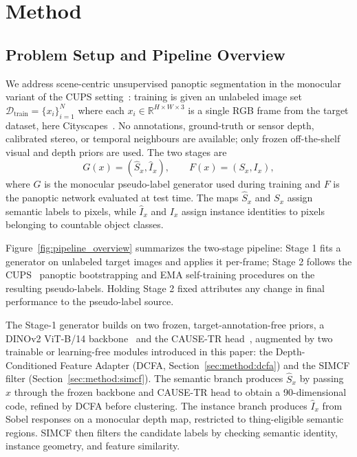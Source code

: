 \documentclass{article}
\begin{document}
\section{Method}
\label{sec:method}

\subsection{Problem Setup and Pipeline Overview}
\label{sec:method:setup}

We address scene-centric unsupervised panoptic segmentation in the monocular variant of the CUPS setting~\cite{hahn2025cups}: training is given an unlabeled image set $\mathcal{D}_{\text{train}} = \{x_i\}_{i=1}^{N}$ where each $x_i \in \mathbb{R}^{H \times W \times 3}$ is a single RGB frame from the target dataset, here Cityscapes~\cite{cordts2016cityscapes}. No annotations, ground-truth or sensor depth, calibrated stereo, or temporal neighbours are available; only frozen off-the-shelf visual and depth priors are used. The two stages are
\begin{equation}
G(x) = (\hat S_x, \hat I_x), \qquad F(x) = (S_x, I_x),
\label{eq:pipeline}
\end{equation}
where $G$ is the monocular pseudo-label generator used during training and $F$ is the panoptic network evaluated at test time. The maps $\hat S_x$ and $S_x$ assign semantic labels to pixels, while $\hat I_x$ and $I_x$ assign instance identities to pixels belonging to countable object classes.

Figure~\ref{fig:pipeline_overview} summarizes the two-stage pipeline: Stage 1 fits a generator on unlabeled target images and applies it per-frame; Stage 2 follows the CUPS~\cite{hahn2025cups} panoptic bootstrapping and EMA self-training procedures on the resulting pseudo-labels. Holding Stage 2 fixed attributes any change in final performance to the pseudo-label source.

The Stage-1 generator builds on two frozen, target-annotation-free priors, a DINOv2 ViT-B/14 backbone~\cite{oquab2024dinov2} and the CAUSE-TR head~\cite{kim2024cause}, augmented by two trainable or learning-free modules introduced in this paper: the Depth-Conditioned Feature Adapter (DCFA, Section~\ref{sec:method:dcfa}) and the SIMCF filter (Section~\ref{sec:method:simcf}). The semantic branch produces $\hat S_x$ by passing $x$ through the frozen backbone and CAUSE-TR head to obtain a 90-dimensional code, refined by DCFA before clustering. The instance branch produces $\hat I_x$ from Sobel responses on a monocular depth map, restricted to thing-eligible semantic regions. SIMCF then filters the candidate labels by checking semantic identity, instance geometry, and feature similarity.
\end{document}
